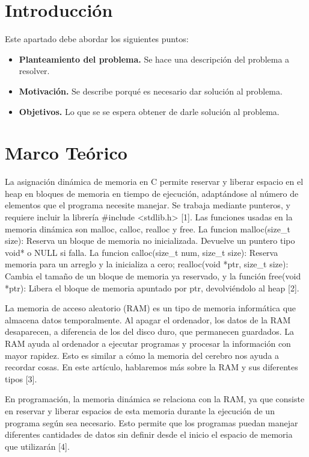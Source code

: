 \documentclass[letterpaper,12pt,oneside]{article}
\begin{document}
\tableofcontents
\clearpage

\section{Introducción}

Este apartado debe abordar los siguientes puntos:

\begin{itemize}
\item \textbf{Planteamiento del problema.} Se hace una descripción del problema a resolver.
\item \textbf{Motivación.} Se describe porqué es necesario dar solución al problema.
\item \textbf{Objetivos.} Lo que se se espera obtener de darle solución al problema.
\end{itemize}

\section{Marco Teórico}

La asignación dinámica de memoria en C permite reservar y liberar espacio en el heap en bloques de memoria en tiempo de ejecución, adaptándose al número de elementos que el programa necesite manejar. Se trabaja mediante punteros, y requiere incluir la librería #include <stdlib.h> [1]. Las funciones usadas en la memoria dinámica son malloc, calloc, realloc y free. La funcion malloc(size\_t size): Reserva un bloque de memoria no inicializada. Devuelve un puntero tipo void* o NULL si falla. La funcion calloc(size\_t num, size\_t size): Reserva memoria para un arreglo y la inicializa a cero; realloc(void *ptr, size\_t size): Cambia el tamaño de un bloque de memoria ya reservado, y la función free(void *ptr): Libera el bloque de memoria apuntado por ptr, devolviéndolo al heap [2].

La memoria de acceso aleatorio (RAM) es un tipo de memoria informática que almacena datos temporalmente. Al apagar el ordenador, los datos de la RAM desaparecen, a diferencia de los del disco duro, que permanecen guardados. La RAM ayuda al ordenador a ejecutar programas y procesar la información con mayor rapidez. Esto es similar a cómo la memoria del cerebro nos ayuda a recordar cosas. En este artículo, hablaremos más sobre la RAM y sus diferentes tipos [3].

En programación, la memoria dinámica se relaciona con la RAM, ya que consiste en reservar y liberar espacios de esta memoria durante la ejecución de un programa según sea necesario. Esto permite que los programas puedan manejar diferentes cantidades de datos sin definir desde el inicio el espacio de memoria que utilizarán [4].
\end{document}
